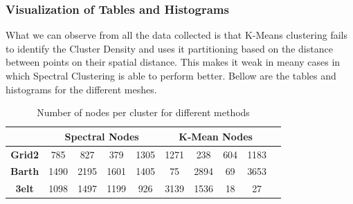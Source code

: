 \documentclass[unicode,11pt,a4paper,oneside,numbers=endperiod,openany]{scrartcl}
\begin{document}
\subsubsection{Visualization of Tables and Histograms}
What we can observe from all the data collected is that K-Means clustering fails to identify the Cluster Density and uses it partitioning based on the distance between points on their spatial distance. This makes it weak in meany cases in which Spectral Clustering is able to perform better. Bellow are the tables and histograms for the different meshes.


\begin{table}[H]
    \centering
    \begin{tabular}{c|cccc|ccccc}
        \toprule
        & \multicolumn{4}{c}{\textbf{Spectral Nodes}} & \multicolumn{4}{c}{\textbf{K-Mean Nodes}} \\

        \bottomrule
        \textbf{Grid2} & 785 & 827 & 379 & 1305 & 1271 & 238 & 604 & 1183 \\
        \bottomrule
        
        \textbf{Barth} & 1490 & 2195 & 1601 & 1405 & 75 & 2894 & 69 & 3653 \\
        \bottomrule
        \textbf{3elt} & 1098 & 1497 & 1199 & 926 & 3139 & 1536 & 18 & 27\\
        \bottomrule
    \end{tabular}
    \caption{Number of nodes per cluster for different methods}
\end{table}
\end{document}
